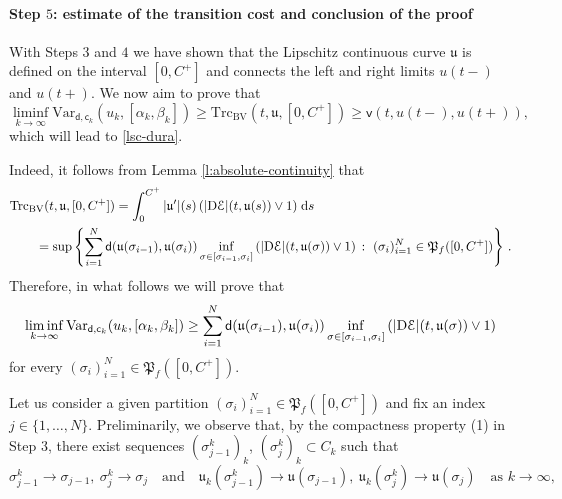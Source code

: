 \documentclass[a4paper,10pt,reqno]{amsart} %
\numberwithin{equation}{section}
\def\rmD{{\mathrm D}} \def\rmE{{\mathrm E}} \def\rmF{{\mathrm F}}
\def\dd{\;\!\mathrm{d}} %
\newcommand{\BV}{\mathrm{BV}}
\newcommand{\mdn}{\mathsf{d}}
\newcommand{\md}[2]{\mathsf{d}(#1,#2)}
\newcommand{\Vari}[4]{\mathrm{Var}_{#1}(#2,[#3,#4])}
\newcommand{\lli}[2]{{#1}({#2}{-})}
\newcommand{\rli}[2]{{#1}({#2}{+})}
\newcommand{\vecostname}{\mathsf{c}}
\newcommand{\bvcost}[3]{\mathsf{v}(#1,#2,#3)}
\newcommand{\slope}[3]{|\rmD {#1}|(#2,#3)}
\newcommand{\tcost}[4]{\mathrm{Trc}_{#1}(#2,#3,#4)}
\newcommand{\invcur}[1]{\mathfrak{u}_{#1}}
\newcommand{\invcu}{\mathfrak{u}}
\begin{document}
  \paragraph{\bf Step $5$: estimate of the transition cost and conclusion of the proof}  With Steps $3$ and $4$ we have shown that the Lipschitz continuous  curve $\invcu$ is defined on the interval $[0,C^+]$  and connects the left and right limits $\lli u t $ and $\rli u t$. 
  We now aim to prove that 
  \begin{equation}
  \label{what-we-want}
   \liminf_{k\to\infty} \Vari{\mdn,\vecostname_k}{u_{k}}{\alpha_k}{\beta_k}   \geq 
  \tcost{\BV}{t}{\invcu}{[0,C^+]}   \geq \bvcost t{\lli u t }{\rli u t},
      \end{equation}
      which will lead to \eqref{lsc-dura}.
  \par
 Indeed, it follows from Lemma \ref{l:absolute-continuity} that 
  \begin{equation}
\label{formula-integrale}
\begin{aligned}
& \tcost{\BV}{t}{\invcu}{[0,C^+]}   = \int_0^{C^+} |\invcu'|(s) \left( \slope \calE t{\invcu(s)} \vee 1 \right)  \dd s    
\\ &  \qquad
=\sup\left\{ \sum_{i=1}^N \md{\invcu(\sigma_{i-1})}{\invcu(\sigma_i)}  \inf_{\sigma \in [\sigma_{i-1},\sigma_i]}\left( \slope \calE t{\invcu(\sigma)} \vee 1 \right)   \, : \ (\sigma_i)_{i=1}^N \in \mathfrak{P}_f([0,C^+]) \right\}\,.
\end{aligned}
\end{equation}
Therefore, in what follows we will prove that
  \begin{equation}
  \label{we-need-this}
   \liminf_{k\to\infty} \Vari{\mdn,\vecostname_k}{u_{k}}{\alpha_k}{\beta_k} \geq   
   \sum_{i=1}^N \md{\invcu(\sigma_{i-1})}{\invcu(\sigma_i)}  \inf_{\sigma \in [\sigma_{i-1},\sigma_i]}\left( \slope \calE t{\invcu(\sigma)} \vee 1 \right) 
  \end{equation}
   for every  $(\sigma_i)_{i=1}^N \in \mathfrak{P}_f([0,C^+])$.
  \par
  Let us consider a given partition  $ (\sigma_i)_{i=1}^N  \in \mathfrak{P}_f([0,C^+])$ and fix an index ${j} \in \{1,\ldots,N\}$. 
   Preliminarily, we observe that, by the compactness property (1)  in Step $3$,
there exist sequences $(\sigma_{j-1}^k)_k$, 
$(\sigma_j^k)_k \subset C_k$ such that 
\begin{equation}
\label{approximation-partition}
\sigma_{j-1}^k\to\sigma_{j-1}, \  
\sigma_j^k\to\sigma_j \quad \text{and} \quad 
 \invcur k (\sigma_{j-1}^k)\to\invcu(\sigma_{j-1}),\  
\invcur k (\sigma_j^k)\to\invcu(\sigma_j)\quad \text{as }k \to\infty,
\end{equation}
\end{document}

